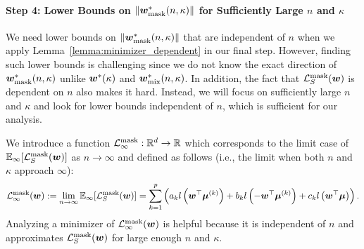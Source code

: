 \paragraph{Step 4: Lower Bounds on $\lVert {\bm{w}}^*_\mathrm{mask}(n,\kappa) \rVert$ for Sufficiently Large $n$ and $\kappa$} \quad

We need lower bounds on $\lVert {\bm{w}}^*_\mathrm{mask}(n,\kappa) \rVert$ that are independent of $n$ when we apply Lemma~\ref{lemma:minimizer_dependent} in our final step. However, finding such lower bounds is challenging since we do not know the exact direction of ${\bm{w}}^*_\mathrm{mask}(n,\kappa)$ unlike ${\bm{w}}^*(\kappa)$ and ${\bm{w}}^*_\mathrm{mix}(n,\kappa)$. In addition, the fact that $\mathcal{L}_S^\mathrm{mask}({\bm{w}})$ is dependent on $n$ also makes it hard. 
Instead, we will focus on sufficiently large $n$ and $\kappa$ and look for lower bounds independent of $n$, which is sufficient for our analysis.

We introduce a function $\mathcal{L}_\infty^\mathrm{mask} :  \mathbb{R}^d \to \mathbb{R}$ which corresponds to the limit case of $\mathbb{E}_\infty [\mathcal{L}_S^\mathrm{mask} ({\bm{w}})]$ as $n \rightarrow \infty$ and defined as follows (i.e., the limit when both $n$ and $\kappa$ approach $\infty$):
\begin{equation}\label{eqn:mask_infty_limit}
    \mathcal{L}_\infty^\mathrm{mask}({\bm{w}}) := \lim_{n \rightarrow \infty} \mathbb{E}_{\infty}[\mathcal{L}_S^\mathrm{mask}({\bm{w}})]= \sum_{k=1}^p \left(a_k l\left ({\bm{w}}^\top {\bm{\mu}}^{(k)}\right) + b_k l\left (- {\bm{w}}^\top {\bm{\mu}}^{(k)}\right) + c_k l\left ({\bm{w}}^\top {\bm{\mu}}\right) \right).
\end{equation}
Analyzing a minimizer of $\mathcal{L}_\infty^\mathrm{mask}({\bm{w}})$ is helpful because it is independent of $n$ and approximates  $\mathcal{L}_S^\mathrm{mask}({\bm{w}})$ for large enough $n$ and $\kappa$.

